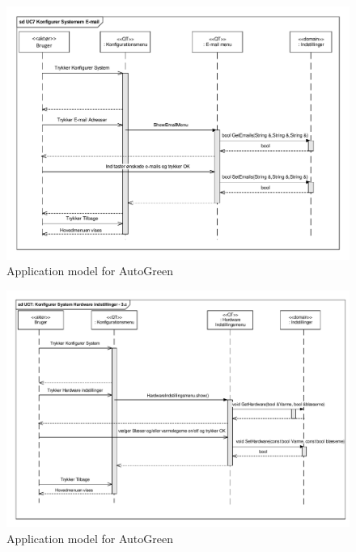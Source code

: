 \begin{figure}[!h]
\centering 
\includegraphics[width={\textwidth-1cm}, trim=0 0 0 0, clip=true] {../fig/SD_autoGreen_UC_7_E_mail.pdf}
\caption{Application model for AutoGreen}
\label{fig:SD_UC7}
\end{figure}

\clearpage

\begin{figure}[!h]
\centering 
\includegraphics[width={\textwidth-1cm}, trim=0 0 0 0, clip=true] {../fig/SD_autoGreen_UC_7_Hardware_indstillinger.pdf}
\caption{Application model for AutoGreen}
\label{fig:SD_UC7_alt1}
\end{figure}

\clearpage

